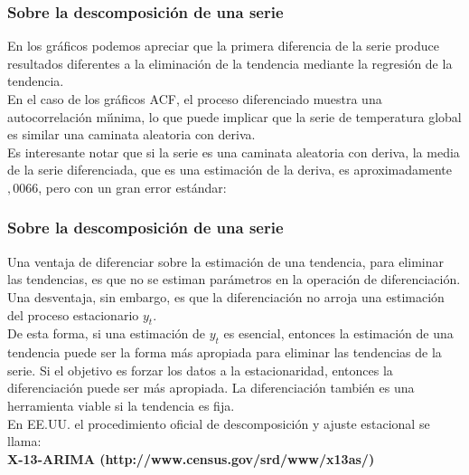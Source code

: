 \documentclass[spanish,xcolor=table]{beamer}
\begin{document}
\begin{frame}
\frametitle{Sobre la descomposici\'on de una serie}

En los gr\'aficos podemos apreciar que la primera diferencia de la serie produce resultados diferentes a la eliminaci\'on de la tendencia mediante la regresi\'on de la tendencia.\\
En el caso de los gr\'aficos ACF, el proceso diferenciado muestra una autocorrelaci\'on mi\'{\i}nima, lo que puede implicar que la serie de temperatura global es similar una caminata aleatoria con deriva.\\
Es interesante notar que si la serie es una caminata aleatoria con deriva, la media de la serie diferenciada, que es una estimaci\'on de la deriva, es aproximadamente $,0066$, pero con un gran error est\'andar:\\
\end{frame}

\begin{frame}
\frametitle{Sobre la descomposici\'on de una serie}

Una ventaja de diferenciar sobre la estimaci\'on de una tendencia,  para eliminar las tendencias, es que no se estiman par\'ametros en la operaci\'on de diferenciaci\'on. Una desventaja, sin embargo, es que la diferenciaci\'on no arroja una estimaci\'on del proceso estacionario $y_t$.\\
\vspace{5mm}	 
De esta forma, si una estimaci\'on de $y_t$ es esencial, entonces la estimaci\'on de una tendencia puede ser la forma m\'as apropiada para eliminar las tendencias de la serie. Si el objetivo es forzar los datos a la estacionaridad, entonces la diferenciaci\'on puede ser m\'as apropiada. La diferenciaci\'on tambi\'en es una herramienta viable si la tendencia es fija.\\
 \vspace{3mm}	
 En EE.UU. el procedimiento oficial de descomposici\'on y ajuste estacional se llama:\\
 \vspace{3mm}	
 \textbf{X-13-ARIMA (http://www.census.gov/srd/www/x13as/)}

\end{frame}
\end{document}
